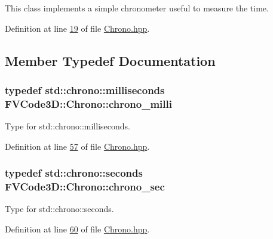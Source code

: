 This class implements a simple chronometer useful to measure the time. 

Definition at line \hyperlink{Chrono_8hpp_source_l00019}{19} of file \hyperlink{Chrono_8hpp_source}{Chrono.\+hpp}.



\subsection{Member Typedef Documentation}
\subsubsection[{\texorpdfstring{chrono\+\_\+milli}{chrono_milli}}]{\setlength{\rightskip}{0pt plus 5cm}typedef std\+::chrono\+::milliseconds {\bf F\+V\+Code3\+D\+::\+Chrono\+::chrono\+\_\+milli}\hspace{0.3cm}{\ttfamily [private]}}\hypertarget{classFVCode3D_1_1Chrono_abb09cf94de0298f1e42b9b93d9134bee}{}\label{classFVCode3D_1_1Chrono_abb09cf94de0298f1e42b9b93d9134bee}


Type for std\+::chrono\+::milliseconds. 



Definition at line \hyperlink{Chrono_8hpp_source_l00057}{57} of file \hyperlink{Chrono_8hpp_source}{Chrono.\+hpp}.

\subsubsection[{\texorpdfstring{chrono\+\_\+sec}{chrono_sec}}]{\setlength{\rightskip}{0pt plus 5cm}typedef std\+::chrono\+::seconds {\bf F\+V\+Code3\+D\+::\+Chrono\+::chrono\+\_\+sec}\hspace{0.3cm}{\ttfamily [private]}}\hypertarget{classFVCode3D_1_1Chrono_a282eb6bb9bc31cca9094ecd4c7c1939f}{}\label{classFVCode3D_1_1Chrono_a282eb6bb9bc31cca9094ecd4c7c1939f}


Type for std\+::chrono\+::seconds. 



Definition at line \hyperlink{Chrono_8hpp_source_l00060}{60} of file \hyperlink{Chrono_8hpp_source}{Chrono.\+hpp}.

